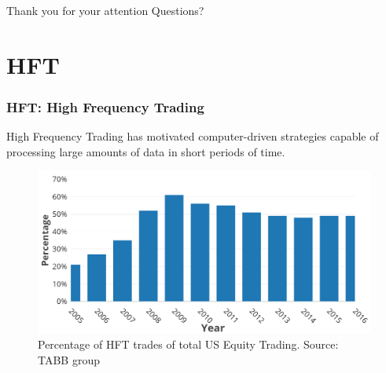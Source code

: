 \documentclass{beamer}
\begin{document}
\begin{frame}[plain,c]
\begin{center}
\Huge Thank you for your attention
\Huge Questions?
\end{center}
\end{frame}



%





\appendix

\section{HFT}
\begin{frame}
\frametitle{HFT: High Frequency Trading}
High Frequency Trading has motivated computer-driven strategies capable of processing large amounts of data in short periods of time.
\begin{figure}
\includegraphics[width=0.7\paperwidth]{img/HFTmarket}
\caption{Percentage of HFT trades of total US Equity Trading. Source: TABB group}
\end{figure}
\end{frame}
\end{document}
